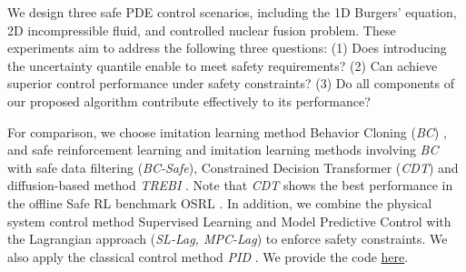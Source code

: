 We design three safe PDE control scenarios, including the 1D Burgers’ equation, 2D incompressible fluid, and controlled nuclear fusion problem. These experiments aim to address the following three questions: (1) Does introducing the uncertainty quantile enable \proj to meet safety requirements? (2) Can \proj achieve superior control performance under safety constraints? (3) Do all components of our proposed algorithm contribute effectively to its performance?

For comparison, we choose imitation learning method Behavior Cloning (\textit{BC}) \citep{pomerleau1988alvinn}, and safe reinforcement learning and imitation learning methods involving \textit{BC} with safe data filtering (\textit{BC-Safe}), Constrained Decision Transformer (\textit{CDT}) \citep{liu2023constrained}
and diffusion-based method \textit{TREBI} \citep{lin2023safe}. Note that \textit{CDT} shows the best performance in the offline Safe RL benchmark OSRL \citep{liu2023datasets}. In addition, we combine the physical system control method Supervised Learning \citep{hwang2022solving} and Model Predictive Control \citep{schwenzer2021review} with the Lagrangian approach \citep{chow2018risk} (\textit{SL-Lag, MPC-Lag}) to enforce safety constraints. We also apply the classical control method \textit{PID} \citep{1580152}. We provide the code \href{https://github.com/AI4Science-WestlakeU/safediffcon}{here}.


